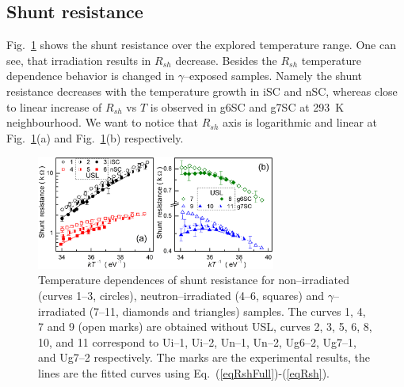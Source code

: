 \documentclass[aip,jap, amsmath,amssymb,reprint]{revtex4-1}
\begin{document}
\subsection{Shunt resistance\label{Rsh}}
Fig.~\ref{fig_Rsh} shows the  shunt resistance  over the explored temperature range.
One can see, that irradiation results in $R_{sh}$ decrease.
Besides the $R_{sh}$ temperature dependence behavior is changed in $\gamma$--exposed samples.
Namely the shunt resistance decreases with the temperature growth in iSC and nSC,
whereas close to linear increase of $R_{sh}$ vs $T$  is observed in g6SC and g7SC at 293~K neighbourhood.
We want to notice that $R_{sh}$ axis is logarithmic and linear at Fig.~\ref{fig_Rsh}(a) and Fig.~\ref{fig_Rsh}(b) respectively.

\begin{figure}
\includegraphics[width=0.7\textwidth]{olikhFig8}%
\caption{\label{fig_Rsh}
Temperature dependences of shunt resistance for non--irradiated (curves 1--3, circles),
neutron--irradiated (4--6, squares) and $\gamma$--irradiated (7--11, diamonds and triangles) samples.
The curves 1, 4, 7 and 9 (open marks) are obtained without USL,
curves 2, 3, 5, 6, 8, 10, and 11 correspond to
Ui--1, Ui--2, Un--1, Un--2, Ug6--2, Ug7--1, and Ug7--2 respectively.
The marks are the experimental results, the lines are the fitted curves using Eq.~(\ref{eqRshFull})-(\ref{eqRsh}).
}%
\end{figure}
\end{document}

